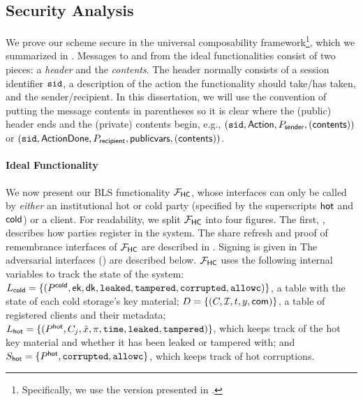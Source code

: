 \subsection{Security Analysis}\label{sec:security}

We prove our scheme secure in the universal composability framework\footnote{Specifically, we use the version presented in \cite{EPRINT:CLOS02}.}, which we summarized in .
Messages to and from the ideal functionalities consist of two pieces: a \emph{header} and the \emph{contents}. The header normally consists of a session identifier $\texttt{sid}$, a description of the action the functionality should take/has taken, and the sender/recipient. In this dissertation, we will use the convention of putting the message contents in parentheses so it is clear where the (public) header ends and the (private) contents begin, e.g., $(\texttt{sid}, \mathsf{Action}, P_{\sf sender}, (\mathsf{contents}))$ or $(\texttt{sid}, \mathsf{ActionDone}, P_{\sf recipient}, \mathsf{publicvars},\allowbreak (\mathsf{contents}))$.

\paragraph{Ideal Functionality}





We now present our BLS \hcwl functionality $\mathcal{F}_\mathsf{HC}$, whose interfaces can only be called by \emph{either} an institutional hot or cold party (specified by the superscripts $\mathsf{hot}$ and $\mathsf{cold}$) or a client. For readability, we split $\mathcal{F}_\mathsf{HC}$ into four figures. The first, , describes how parties register in the system.
The share refresh and proof of remembrance interfaces of $\mathcal{F}_\mathsf{HC}$ are described in . Signing is given in 
The adversarial interfaces () are described below. $\mathcal{F}_\mathsf{HC}$ uses the following internal variables to track the state of the system: 
$L_{\mathsf{cold}} = \{(P^{\mathsf{cold}}, \mathsf{ek}, \mathsf{dk}, \texttt{leaked}, \texttt{tampered}, \texttt{corrupted}, \texttt{allowc})\}$, a table with the state of each cold storage's key material;
$D = \{(C, \mathcal{I}, t, y, \mathsf{com})\}$, a table of registered clients and their metadata;
$L_{\mathsf{hot}} = \{(P^{\mathsf{hot}}, C_j, \tilde{x}, \pi, \texttt{time},\allowbreak \texttt{leaked}, \texttt{tampered})\}$, which keeps track of the hot key material and whether it has been leaked or tampered with;
and $S_{\mathsf{hot}} = \{P^{\mathsf{hot}}, \texttt{corrupted}, \texttt{allowc}\}$, which keeps track of hot corruptions.

